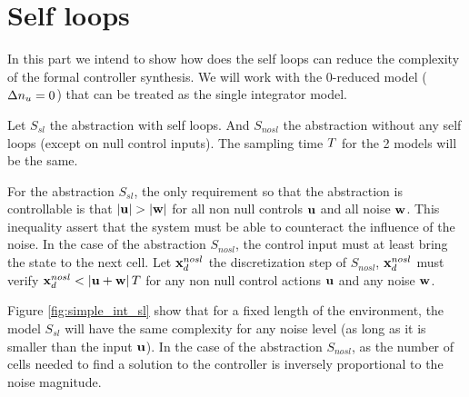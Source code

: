 \section{Self loops}
%
%
\newcommand{\Snosl}{S_{nosl}}
\newcommand{\Ssl}{S_{sl}}
\newcommand{\xdsl}{\xd^{sl}}
\newcommand{\xdnosl}{\xd^{nosl}}
In this part we intend to show how does the self loops can reduce the complexity of the formal controller synthesis.
We will work with the 0-reduced model ($\Delta n_u=0$) that can be treated as the single integrator model.

Let $\Ssl$ the abstraction with self loops. And $\Snosl$ the abstraction without any self loops (except on null control inputs).
The sampling time $T$ for the 2 models will be the same.

For the abstraction $\Ssl$, the only requirement so that the abstraction is controllable is that $\abs{\u}>\abs{\w}$ for all non null controls $ \mathbf{u}$ and all noise $ \mathbf{w}$.
This inequality assert that the system must be able to counteract the influence of the noise.
In the case of the abstraction $\Snosl$, the control input must at least bring the state to the next cell.
Let $\xdnosl$ the discretization step of $\Snosl$, $\xdnosl$ must verify $\xdnosl<\abs{\u + \w}\dt$ for any non null control actions $ \mathbf{u}$ and any noise $ \mathbf{w}$. 

Figure \ref{fig:simple_int_sl} show that for a fixed length of the environment, the model $\Ssl$ will have the same complexity for any noise level (as long as it is smaller than the input $ \mathbf{u}$).
In the case of the abstraction $\Snosl$, as the number of cells needed to find a solution to the controller is inversely proportional to the noise magnitude.

